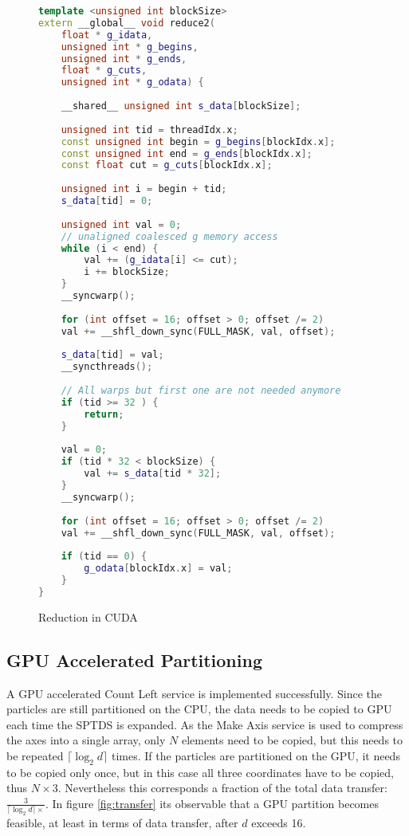 \documentclass[]{article}
\begin{document}
\begin{figure}[H]
	\begin{lstlisting}[language=c++, caption=Kernel Optimized GPU Count Left,
		label = ctlocudawrp]
 template <unsigned int blockSize>
extern __global__ void reduce2(
	float * g_idata,
	unsigned int * g_begins,
	unsigned int * g_ends,
	float * g_cuts,
	unsigned int * g_odata) {
	
	__shared__ unsigned int s_data[blockSize];
	
	unsigned int tid = threadIdx.x;
	const unsigned int begin = g_begins[blockIdx.x];
	const unsigned int end = g_ends[blockIdx.x];
	const float cut = g_cuts[blockIdx.x];
	
	unsigned int i = begin + tid;
	s_data[tid] = 0;
	
	unsigned int val = 0;
	// unaligned coalesced g memory access
	while (i < end) {
		val += (g_idata[i] <= cut);
		i += blockSize;
	}
	__syncwarp();
	
	for (int offset = 16; offset > 0; offset /= 2)
	val += __shfl_down_sync(FULL_MASK, val, offset);
	
	s_data[tid] = val;
	__syncthreads();
	
	// All warps but first one are not needed anymore
	if (tid >= 32 ) {
		return;
	}
	
	val = 0;    
	if (tid * 32 < blockSize) {
		val += s_data[tid * 32];
	}
	__syncwarp();
	
	for (int offset = 16; offset > 0; offset /= 2)
	val += __shfl_down_sync(FULL_MASK, val, offset);
	
	if (tid == 0) {
		g_odata[blockIdx.x] = val;
	}
}
	\end{lstlisting}
	\caption{Reduction in CUDA}
	\label{cuda:reduction3}
\end{figure}



\subsection{GPU Accelerated Partitioning}

A GPU accelerated Count Left service is implemented successfully. Since the particles are still partitioned on the CPU, the data needs to be copied to GPU each time the SPTDS is expanded. As the Make Axis service is used to compress the axes into a single array, only $N$ elements need to be copied, but this needs to be repeated $\lceil \log_2 d \rceil$ times. 
If the particles are partitioned on the GPU, it needs to be copied only once, but in this case all three coordinates have to be copied, thus $
N \times 3$. Nevertheless this corresponds a fraction of the total data transfer: $\frac{3}{\lceil \log_2 d \rceil \times}$. In figure \ref{fig:transfer} its observable that a GPU partition becomes feasible, at least in terms of data transfer, after $d$ exceeds 16. 
\end{document}
